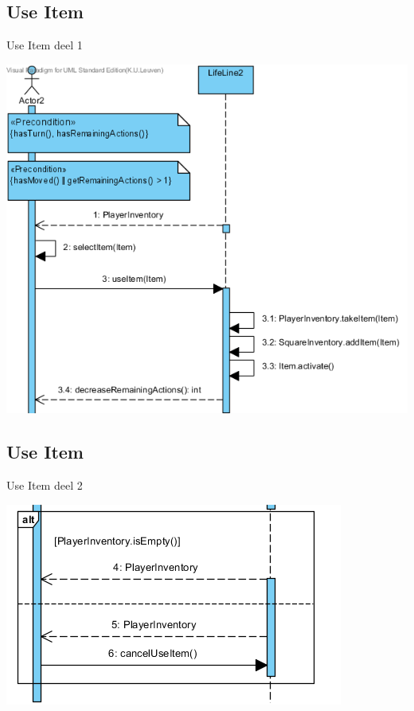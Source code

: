 \documentclass[t]{beamer}
\begin{document}
\subsection{Use Item}
\begin{frame}{Use Item deel 1}
\begin{center}
\includegraphics[scale=0.5]{images/SSDUseItem1}
\end{center}
\end{frame}


\subsection{Use Item}
\begin{frame}{Use Item deel 2}
\begin{center}
\includegraphics[scale=0.9]{images/SSDUseItem2}
\end{center}
\end{frame}
\end{document}
